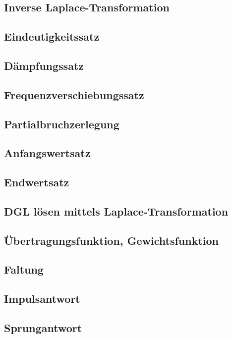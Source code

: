 \subsection{Inverse Laplace-Transformation}


\subsection{Eindeutigkeitssatz}


\subsection{Dämpfungssatz}


\subsection{Frequenzverschiebungssatz}


\subsection{Partialbruchzerlegung}


\subsection{Anfangswertsatz}


\subsection{Endwertsatz }


\subsection{DGL lösen mittels Laplace-Transformation}


\subsection{Übertragungsfunktion, Gewichtsfunktion}


\subsection{Faltung}


\subsection{Impulsantwort}


\subsection{Sprungantwort}


